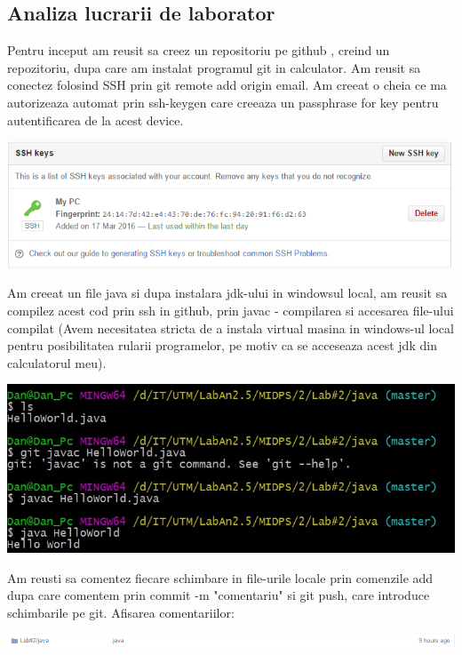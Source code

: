 \subsection{Analiza lucrarii de laborator}
Pentru inceput am reusit sa creez un repositoriu pe github , creind un repozitoriu, dupa care am instalat programul git in calculator.
Am reusit sa conectez folosind SSH prin git remote add origin email.
Am creeat o cheia ce ma autorizeaza automat prin  ssh-keygen care creeaza un passphrase for key pentru autentificarea de la acest device.
\begin{center}
	\includegraphics[width=0.7\linewidth]{1key}
\end{center}
Am creeat un file java si dupa instalara jdk-ului in windowsul local, am reusit sa compilez acest cod prin ssh in github, prin javac - compilarea si accesarea file-ului compilat (Avem necesitatea stricta de a instala virtual masina in windows-ul local pentru posibilitatea rularii programelor, pe motiv ca se acceseaza acest jdk din calculatorul meu).
\begin{center}
\includegraphics[width=0.7\linewidth]{2java}
\end{center}

Am reusti sa comentez fiecare schimbare in file-urile locale prin comenzile add dupa care comentem prin commit -m "comentariu" si git push, care introduce schimbarile pe git. Afisarea comentariilor:
\begin{center}
\includegraphics[width=0.7\linewidth]{3commit}
\end{center}

